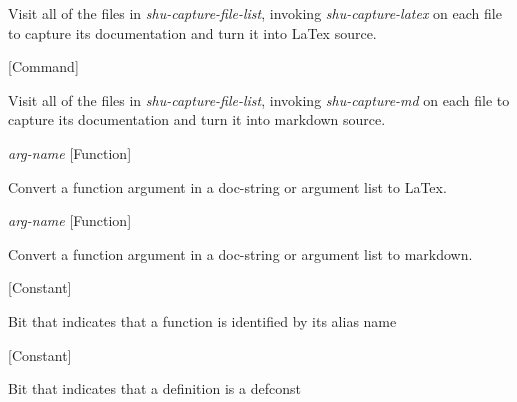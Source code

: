 \begin{doc-string}
Visit all of the files in \emph{shu-capture-file-list}, invoking \emph{shu-capture-latex} on
each file to capture its documentation and turn it into LaTex source.
\end{doc-string}

\vspace{1em}
\noindent
{}
\usebox{\funcname}
 \hfill [Command]

\begin{doc-string}
Visit all of the files in \emph{shu-capture-file-list}, invoking \emph{shu-capture-md} on each
file to capture its documentation and turn it into markdown source.
\end{doc-string}

\vspace{1em}
\noindent
{}
\usebox{\funcname}\emph{arg-name}
 \hfill [Function]

\begin{doc-string}
Convert a function argument in a doc-string or argument list to LaTex.
\end{doc-string}

\vspace{1em}
\noindent
{}
\usebox{\funcname}\emph{arg-name}
 \hfill [Function]

\begin{doc-string}
Convert a function argument in a doc-string or argument list to markdown.
\end{doc-string}

\vspace{1em}
\noindent
{}
\usebox{\funcname}
 \hfill [Constant]

\begin{doc-string}
Bit that indicates that a function is identified by its alias name
\end{doc-string}

\vspace{1em}
\noindent
{}
\usebox{\funcname}
 \hfill [Constant]

\begin{doc-string}
Bit that indicates that a definition is a defconst
\end{doc-string}

